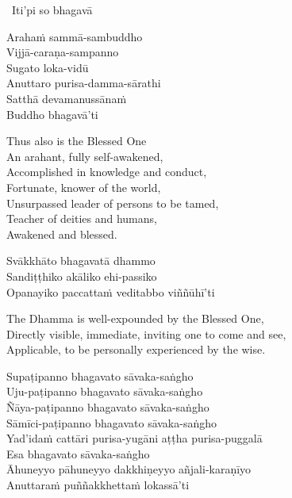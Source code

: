 \begin{pali-leader}
  \anglebracketleft\ \hspace{-0.5mm}Iti'pi so bhagavā \hspace{-0.5mm}\anglebracketright\
\end{pali-leader}
\begin{pali-hangtogether}
  Arahaṁ sammā-sambuddho\\
  Vijjā-caraṇa-sampanno\\
  Sugato loka-vidū\\
  Anuttaro purisa-damma-sārathi\\
  Satthā devamanussānaṁ\\
  Buddho bhagavā'ti
\end{pali-hangtogether}

\begin{english-verses}
  Thus also is the Blessed One\\
  An arahant, fully self-awakened,\\
  Accomplished in knowledge and conduct,\\
  Fortunate, knower of the world,\\
  Unsurpassed leader of persons to be tamed,\\
  Teacher of deities and humans,\\
  Awakened and blessed.
\end{english-verses}

\begin{pali-hang-continued}
  Svākkhāto bhagavatā dhammo\\
  Sandiṭṭhiko akāliko ehi-passiko\\
  Opanayiko paccattaṁ veditabbo viññūhī'ti
\end{pali-hang-continued}

\begin{english-verses}
  The Dhamma is well-expounded by the Blessed One,\\
  Directly visible, immediate, inviting one to come and see,\\
  Applicable, to be personally experienced by the wise.
\end{english-verses}

\begin{pali-hang-continued}
  Supaṭipanno bhagavato sāvaka-saṅgho\\
  Uju-paṭipanno bhagavato sāvaka-saṅgho\\
  Ñāya-paṭipanno bhagavato sāvaka-saṅgho\\
  Sāmīci-paṭipanno bhagavato sāvaka-saṅgho\\
  Yad'idaṁ cattāri purisa-yugāni aṭṭha purisa-puggalā\\
  Esa bhagavato sāvaka-saṅgho\\
  Āhuneyyo pāhuneyyo dakkhiṇeyyo añjali-karaṇīyo\\
  Anuttaraṁ puññakkhettaṁ lokassā'ti
\end{pali-hang-continued}

